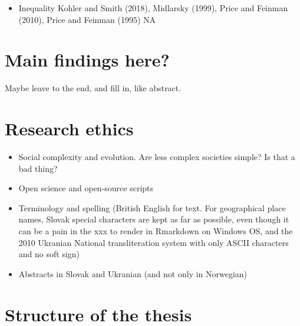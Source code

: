 \documentclass[
  12pt,
]{book}
\providecommand{\tightlist}{%
  \setlength{\itemsep}{0pt}\setlength{\parskip}{0pt}}
\begin{document}
\begin{itemize}
\tightlist
\item
  Inequality Kohler and Smith (2018), Midlarsky (1999), Price and Feinman (2010), Price and Feinman (1995) NA
\end{itemize}

\hypertarget{main-findings-here}{%
\section{Main findings here?}\label{main-findings-here}}

Maybe leave to the end, and fill in, like abstract.

\hypertarget{research-ethics}{%
\section{Research ethics}\label{research-ethics}}

\begin{itemize}
\item
  Social complexity and evolution. Are less complex societies simple? Is that a bad thing?
\item
  Open science and open-source scripts
\item
  Terminology and spelling (British English for text. For geographical place names, Slovak special characters are kept as far as possible, even though it can be a pain in the xxx to render in Rmarkdown on Windows OS, and the 2010 Ukranian National transliteration system with only ASCII characters and no soft sign)
\item
  Abstracts in Slovak and Ukranian (and not only in Norwegian)
\end{itemize}

\hypertarget{structure-of-the-thesis}{%
\section{Structure of the thesis}\label{structure-of-the-thesis}}
\end{document}
